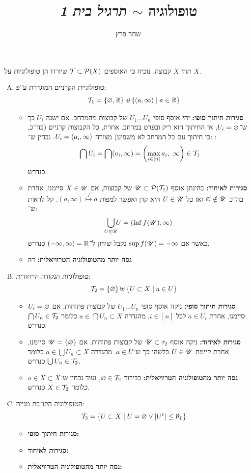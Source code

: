 \documentclass[]{../../../../../tex/classes/homework}
\author{שחר פרץ}
\title{טופולוגיה $\sim$ \textit{תרגיל בית 1}}
\begin{document}
	\maketitle
	
	
	\section{}
	תהי $X$ קבוצה. נוכיח כי האוספים $\mathcal{T} \subset \mathcal{P}(X)$ שיורדו הן טופולוגיות על $X$. 
	\begin{enumerate}[(A)]
		\item טופולוגיית הקרניים המוגדרת ע''פ:
		\[ \mathcal{T}_1 = \{\varnothing, \mathbb{R}\} \uplus\{(a, \infty) \mid a \in \mathbb{R}\} \]
		\begin{itemize}
			\item \textbf{סגירות חיתוך סופי: }יהי אוסף סופי $U_1 \dots U_n$ של קבוצות מהמרחב. אם ישנה $U_i$ כך ש־$U_i = \varnothing$, אז החיתוך הוא ריק ובפרט במרחב. אחרת, כל הקבוצות קרניים (בה''כ, כי חיתוך עם כל המרחב לא משפיע) מצורה $U_i = (a_i, \infty)$. נבחין ש־: :
			\[ \bigcap U_i = \bigcap (a_i, \infty) = \left ( \max_{i \in [n]} a_i, \ \infty \right ) \in \mathcal{T}_1 \]
			כנדרש. 
			\item \textbf{סגירות לאיחוד: }בהינתן אוסף $\mathscr{U} \subset \mathcal{P}(\mathcal{T}_1)$ של קבוצות, אם $X \in \mathscr{U}$ סיימנו, אחרת בה''כ $\varnothing \notin \mathscr{U}$ ואז כל $U \in \mathscr{U}$ היא קרן ואפשר למפות $(a, \infty) \overset{f}{\mapsto} a$. קל לראות ש־: 
			\[ \bigcup_{\mathclap{U \in \UU}} U = (\inf f(\UU), \inft) \]
			כאשר אם $\sup f(\mathscr{U}) = -\infty$ נקבל שוויון ל־$(-\infty, \infty) = \mathbb{R}$ כנדרש. 
			\item \textbf{גסה יותר מהטופולוגיה הטרוויאלית: }דה
		\end{itemize}
		\item טופולוגיות הנקודה הייחודית:
		\[ \mathcal{T}_2 = \{\varnothing\} \uplus \{U \subset X \mid a \in U\} \]
		\begin{itemize}
			\item \textbf{סגירות חיתוך סופי: }ניקח אוסף סופי $U_1 \dots U_n$ של קבוצות פתוחות. אם $U_i = \varnothing$ סיימנו, אחרת $a \in U_i$ לכל $i \in [n]$. מהגדרה $a \in \bigcap U_n \subset X$ כלומר $\bigcap U_n \in \mathcal{T}_2$ כנדרש. 
			\item \textbf{סגירות לאיחוד: }ניקח אוסף $\mathscr{U} \subset \tau_2$ של קבוצות פתוחות. אם $\mathscr{U} = \{\varnothing\}$ סיימנו, אחרת קיימת $U \in \mathscr{U}$ כלשהי כך ש־$a \in U$. מהגדרה $a \in \bigcup U_n \subset X$ כלומר $\bigcup U_n \in \mathcal{T}_2$ כנדרש. 
			\item \textbf{גסה יותר מהטופולוגיה הטרוויאלית: }בבירור $\varnothing \in \mathcal{T}_2$, ועוד נבחין ש־$a \in X \subset X$ כלומר $X \in \mathcal{T}_2$ כנדרש. 
		\end{itemize}
		\item הטופולוגיה הקו־בת מנייה: 
		\[ \mathcal{T}_3 = \{U \subset X \mid U = \varnothing \lor \left \lvert U^{c} \right \rvert \le \aleph_0\} \]
		\begin{itemize}
			\item \textbf{סגירות חיתוך סופי: }
			\item \textbf{סגירות לאיחוד: }
			\item \textbf{גסה יותר מהטופולוגיה הטרוויאלית: }
		\end{itemize}
	\end{enumerate}
	
\end{document}
